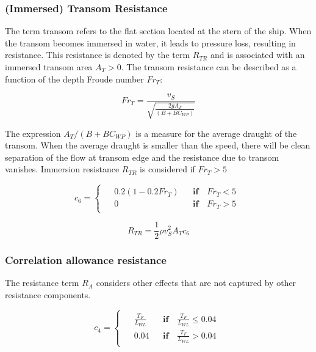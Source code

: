\subsubsection*{(Immersed) Transom Resistance}

The term transom refers to the flat section located at the stern of the ship. When the transom becomes immersed in water, it leads to pressure loss, resulting in resistance. This resistance is denoted by the term $R_{TR}$ and is associated with an immersed transom area $A_T > 0$. The transom resistance can be described as a function of the depth Froude number $Fr_{T}$:

\begin{equation}
    \label{eqn:Fr_t}
    Fr_T = \frac{v_S}{\sqrt{\frac{2gA_T}{(B+BC_{WP})}}}
\end{equation}

The expression $A_T/(B+BC_{WP})$ is a measure for the average draught of the transom. When the average draught is smaller than the speed, there will be clean separation of the flow at transom edge and the resistance due to transom vanishes. Immersion resistance $R_{TR}$ is considered if $Fr_{T} > 5$ 

\begin{equation}
    \label{eqn:c6}
        c_6 = 
        \begin{cases}
            \begin{aligned}
              &0.2(1-0.2Fr_T) && \textbf{if} \quad Fr_T < 5 \\
              & 0 && \textbf{if} \quad Fr_T > 5  
            \end{aligned}
        \end{cases}
\end{equation}

\begin{equation}
    \label{eqn:R_transom}
    R_{TR} = \frac{1}{2}\rho v_S^2 A_T c_6
\end{equation}

\subsubsection*{Correlation allowance resistance}

The resistance term $R_A$ considers other effects that are not captured by other resistance components. 

\begin{equation}
    \label{eqn:c4}
    c_4 =
    \begin{cases}
        \begin{aligned}
            &\frac{T_F}{L_{WL}} && \textbf{if} \quad \frac{T_F}{L_{WL}} \leqslant 0.04 \\
            &0.04 && \textbf{if} \quad \frac{T_F}{L_{WL}} >0.04 
        \end{aligned}
    \end{cases}
\end{equation}

